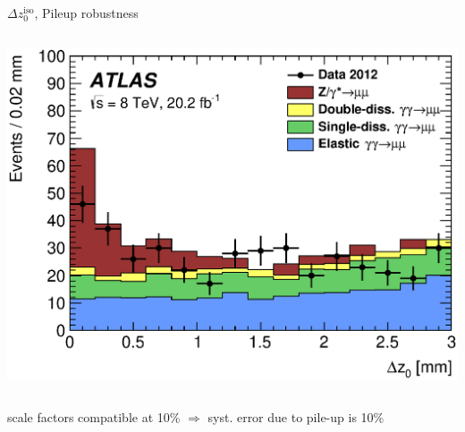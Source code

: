 \documentclass[10pt]{beamer}
\newcommand*{\DZ}{\ensuremath{\Delta z_0^{\mathrm{iso}}}}
\begin{document}
\begin{frame}{\DZ, Pileup robustness}
\begin{columns}[T]
\begin{column}{0.6\linewidth}
 \includegraphics[width=\linewidth]{figures/dilepton_dzone6.eps} 
	\end{column}
\end{columns}
\begin{outline}
 scale factors compatible at 10\% $\Rightarrow$ syst. error due to pile-up is 10\%
\end{outline}
\end{frame}
\end{document}
